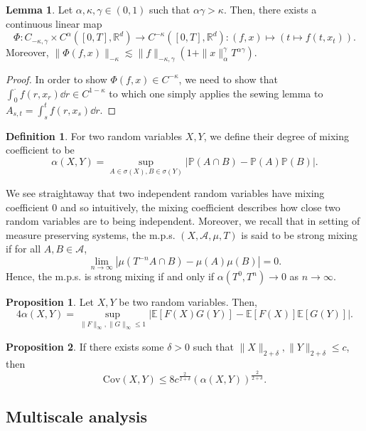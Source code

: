 \documentclass[]{article}
\theoremstyle{definition}
\theoremstyle{definition}
\newtheorem{definition}{Definition}
\newtheorem{lemma}{Lemma}
\newtheorem{proposition}{Proposition}
\begin{document}
\begin{lemma}
  Let \(\alpha, \kappa, \gamma \in (0, 1)\) such that \(\alpha \gamma > \kappa\). Then, there exists a continuous 
  linear map 
  \[\Phi : C_{- \kappa, \gamma} \times C^\alpha([0, T], \mathbb{R}^d) \to C^{-\kappa}([0, T], \mathbb{R}^d)
    : (f, x) \mapsto (t \mapsto f(t, x_t)).\]
  Moreover, \(\|\Phi(f, x)\|_{- \kappa} \lesssim \|f\|_{-\kappa, \gamma}(1 + \|x\|_\alpha^\gamma T^{\alpha \gamma})\).
\end{lemma}
\begin{proof}
  In order to show \(\Phi(f, x) \in C^{-\kappa}\), we need to show that \(\int_0^{\cdot} f(r, x_r) \dd r \in C^{1 - \kappa}\)
  to which one simply applies the sewing lemma to \(A_{s, t} = \int_s^t f(r, x_s) \dd r\).
\end{proof}

\begin{definition}
  For two random variables \(X, Y\), we define their degree of mixing coefficient to be 
  \[\alpha(X, Y) = \sup_{A \in \sigma(X), B \in \sigma(Y)}|\mathbb{P}(A \cap B) - \mathbb{P}(A)\mathbb{P}(B)|.\]
\end{definition}

We see straightaway that two independent random variables have mixing coefficient 0 and so intuitively, 
the mixing coefficient describes how close two random variables are to being independent. Moreover, we 
recall that in setting of measure preserving systems, the m.p.s. \((X, \mathcal{A}, \mu, T)\) is said to be 
strong mixing if for all \(A, B \in \mathcal{A}\), 
\[\lim_{n \to \infty}|\mu(T^{-n}A \cap B) - \mu(A)\mu(B)| = 0.\]
Hence, the m.p.s. is strong mixing if and only if \(\alpha(T^0, T^n) \to 0\) as \(n \to \infty\).

\begin{proposition}
  Let \(X, Y\) be two random variables. Then, 
  \[4 \alpha(X, Y) = \sup_{\|F\|_\infty, \|G\|_\infty \le 1} |\mathbb{E}[F(X) G(Y)] - \mathbb{E}[F(X)]\mathbb{E}[G(Y)]|.\]
\end{proposition}

\begin{proposition}
  If there exists some \(\delta > 0\) such that \(\|X\|_{2 + \delta}, \|Y\|_{2 + \delta} \le c\), then
  \[\text{Cov}(X, Y) \le 8c^{\frac{2}{2 + \delta}} (\alpha(X, Y))^{\frac{2}{2 + \delta}}.\]
\end{proposition}

\subsection*{Multiscale analysis}
\end{document}
